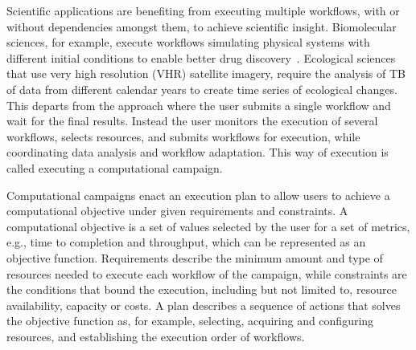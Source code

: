 Scientific applications are benefiting from executing multiple workflows, with or without dependencies amongst them, to achieve scientific insight.
Biomolecular sciences, for example, execute workflows simulating physical systems with different initial conditions to enable better drug discovery~\cite{dakka2018concurrent}.
Ecological sciences that use very high resolution (VHR) satellite imagery, require the analysis of TB of data from different calendar years to create time series of ecological changes.
This departs from the approach where the user submits a single workflow and wait for the final results.
Instead the user monitors the execution of several workflows, selects resources, and submits workflows for execution, while coordinating data analysis and workflow adaptation.
This way of execution is called executing a computational campaign.

Computational campaigns enact an execution plan to allow users to achieve a computational objective under given requirements and constraints.
A computational objective is a set of values selected by the user for a set of metrics, e.g., time to completion and throughput, which can be represented as an objective function.
Requirements describe the minimum amount and type of resources needed to execute each workflow of the campaign, while constraints are the conditions that bound the execution, including but not limited to, resource availability, capacity or costs.
A plan describes a sequence of actions that solves the objective function as, for example, selecting, acquiring and configuring resources, and establishing the execution order of workflows.

